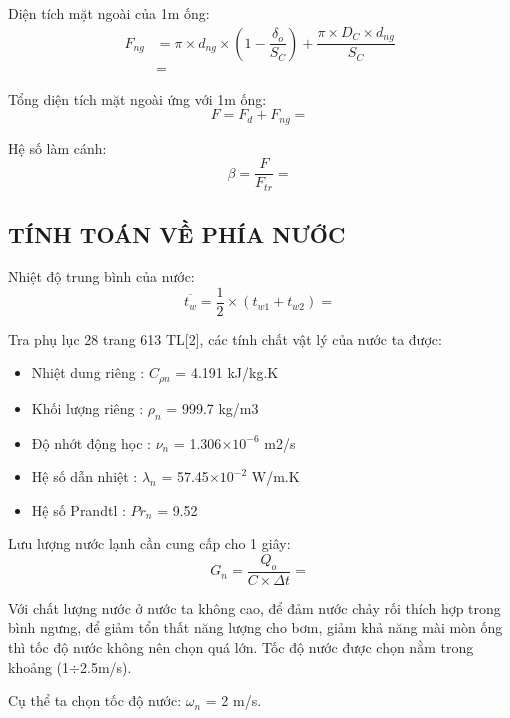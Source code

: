 Diện tích mặt ngoài của 1m ống:
\begin{equation*}
	\begin{split}
		F_{ng} &= \pi\times d_{ng}\times\left(1 - \dfrac{\delta_{o}}{S_{C}}\right) + \dfrac{\pi\times D_{C}\times d_{ng}}{S_{C}} \\
		&= 
	\end{split}
\end{equation*}

Tổng diện tích mặt ngoài ứng với 1m ống:
\begin{equation*}
	F = F_{d} + F_{ng} = 
\end{equation*}

Hệ số làm cánh:
\begin{equation*}
	\beta = \dfrac{F}{F_{tr}} =
\end{equation*}

\subsection{TÍNH TOÁN VỀ PHÍA NƯỚC}
Nhiệt độ trung bình của nước:
\begin{equation*}
	\overline{t_{w}} = \dfrac{1}{2}\times(t_{w1} + t_{w2}) = 
\end{equation*}

Tra phụ lục 28 trang 613 TL[2], các tính chất vật lý của nước ta được:
\begin{itemize}
	\item Nhiệt dung riêng : $C_{\rho n}$ = 4.191 kJ/kg.K
	\item Khối lượng riêng : $ \rho_{n} $ = 999.7 kg/m3
	\item Độ nhớt động học : $ \nu_{n} $ = 1.306$\times10^{-6}$ m2/s
	\item Hệ số dẫn nhiệt : $ \lambda_{n} $ = 57.45$\times10^{-2}$ W/m.K
	\item Hệ số Prandtl : $ Pr_{n} $ = 9.52
\end{itemize}

Lưu lượng nước lạnh cần cung cấp cho 1 giây:
\begin{equation*}
	G_{n} = \dfrac{Q_{o}}{C\times\Delta t} = 
\end{equation*}

Với chất lượng nước ở nước ta không cao, để đảm nước chảy rối thích hợp trong bình ngưng, để giảm tổn thất năng lượng cho bơm, giảm khả năng mài mòn ống thì tốc độ nước không nên chọn quá lớn. Tốc độ nước được chọn nằm trong khoảng (1$\div$2.5m/s).

Cụ thể ta chọn tốc độ nước: $\omega_{n}$ = 2 m/s.

